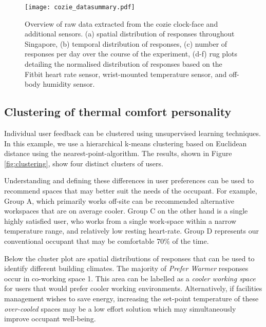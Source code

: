 \begin{figure}
\begin{center}
\texttt{[image: cozie\_datasummary.pdf]}
\caption{Overview of raw data extracted from the cozie clock-face and additional sensors. (a) spatial distribution of responses throughout Singapore, (b) temporal distribution of responses, (c) number of responses per day over the course of the experiment, (d-f) rug plots detailing the normalised distribution of responses based on the Fitbit heart rate sensor, wrist-mounted temperature sensor, and off-body humidity sensor. }
\label{fig:summary}
\end{center}
\end{figure}



\subsection{Clustering of thermal comfort personality}
\label{ch:userResults}
Individual user feedback can be clustered using unsupervised learning techniques. In this example, we use a hierarchical k-means clustering based on Euclidean distance using the nearest-point-algorithm. The results, shown in Figure \ref{fig:clustering}, show four distinct clusters of users. 

Understanding and defining these differences in user preferences can be used to recommend spaces that may better suit the needs of the occupant. For example, Group A, which primarily works off-site can be recommended alternative workspaces that are on average cooler. Group C on the other hand is a single highly satisfied user, who works from a single work-space within a narrow temperature range, and relatively low resting heart-rate. Group D represents our conventional occupant that may be comfortable 70\% of the time. 

Below the cluster plot are spatial distributions of responses that can be used to identify different building climates. The majority of \emph{Prefer Warmer} responses occur in co-working space 1. This area can be labelled as a \emph{cooler working space} for users that would prefer cooler working environments. Alternatively, if facilities management wishes to save energy, increasing the set-point temperature of these \emph{over-cooled} spaces may be a low effort solution which may simultaneously improve occupant well-being. 



